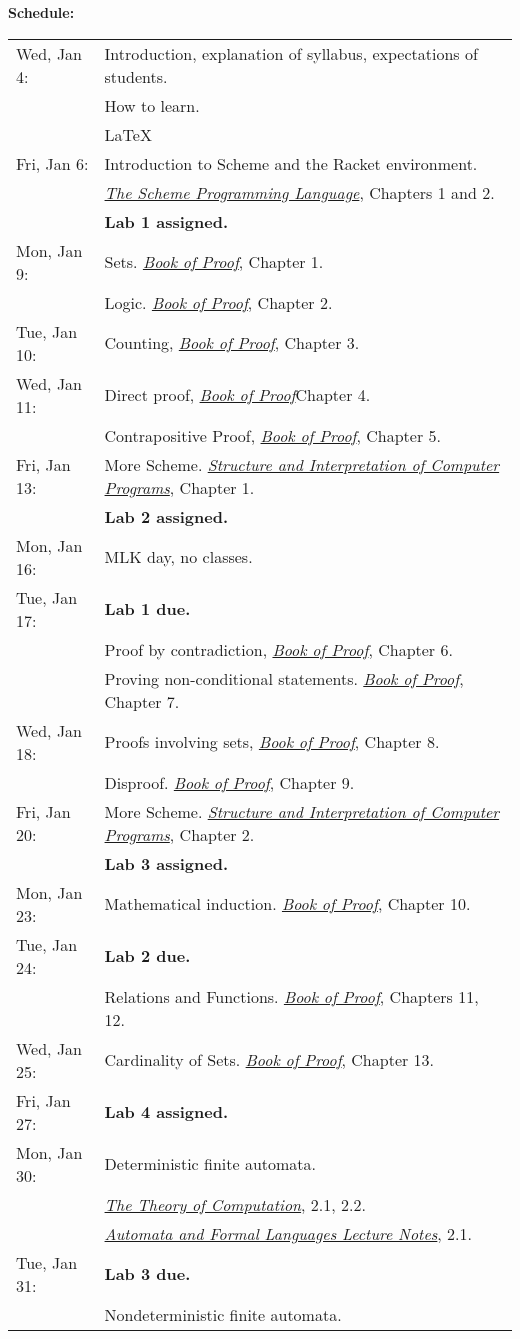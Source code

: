 \documentclass{article}
\newcommand{\bop}
           {\href{http://www.people.vcu.edu/~rhammack/BookOfProof/}
             {{\em      Book    of Proof}}}
\newcommand{\spl}
           {\href{http://www.scheme.com/tspl3/}
             {{\em The Scheme Programming Language}}}
\newcommand{\sicp}           
           {\href{https://mitpress.mit.edu/sicp/}
             {{\em Structure and Interpretation of Computer Programs}}}
\newcommand{\theory}
           {\href{http://cg.scs.carleton.ca/~michiel/TheoryOfComputation/}
             {{\em The Theory of Computation}}}
\newcommand{\automata}
           {\href{http://users.utu.fi/jkari/automata/}
             {{\em Automata and Formal Languages Lecture Notes}}}
\begin{document}
  
{\bf Schedule:}

\begin{longtable}{ll}
Wed, Jan 4:
&   Introduction, explanation of syllabus, expectations of students.
\\&   How to learn.
\\&   \LaTeX
\\
Fri, Jan 6: 
&  Introduction to Scheme and the Racket environment.
\\& \spl, Chapters 1 and 2.
\\ &  {\bf Lab 1 assigned.}
\\\hline
Mon, Jan 9:
&  Sets. \bop, Chapter 1.
\\& Logic. \bop, Chapter  2.
\\
Tue, Jan 10:
&  Counting, \bop, Chapter 3.
\\
Wed, Jan 11:
&  Direct proof, \bop Chapter 4.
\\&   Contrapositive Proof, \bop, Chapter 5.
\\
Fri, Jan 13:
& More Scheme. \sicp, Chapter 1.
\\&  {\bf Lab 2 assigned.} 
\\\hline
Mon, Jan 16:&  MLK day, no classes.
\\
Tue, Jan 17:
& {\bf Lab 1 due.}
\\& Proof by contradiction, \bop, Chapter 6.
\\& Proving non-conditional statements. \bop, Chapter 7.
\\
Wed, Jan 18:
&  Proofs involving sets, \bop, Chapter 8.
\\& Disproof. \bop, Chapter 9.
\\
Fri, Jan 20:
& More Scheme.   \sicp, Chapter 2.
\\& {\bf Lab 3 assigned.}
\\\hline
Mon, Jan 23:
& Mathematical induction.  \bop, Chapter 10.
\\
Tue, Jan 24:
& {\bf Lab 2 due.}
\\&  Relations and Functions.   \bop, Chapters 11, 12.
\\
Wed, Jan 25:
& Cardinality of Sets.  \bop, Chapter 13.
\\
Fri, Jan 27:
& {\bf Lab 4 assigned.}
\\\hline
Mon, Jan 30:
& Deterministic finite automata.
\\&\theory, 2.1, 2.2.
\\&\automata,    2.1.
\\
Tue, Jan 31:
& {\bf Lab 3 due.}
\\& Nondeterministic finite automata.

\end{longtable}
\end{document}

